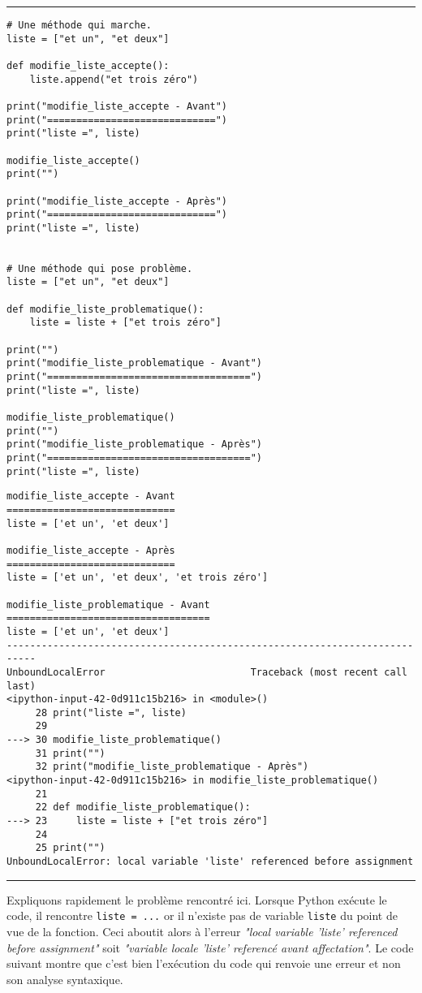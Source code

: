 \bigskip
{\hrule height .5mm}
\begin{verbatim}
# Une méthode qui marche.
liste = ["et un", "et deux"]

def modifie_liste_accepte():
    liste.append("et trois zéro")

print("modifie_liste_accepte - Avant")
print("=============================")
print("liste =", liste)

modifie_liste_accepte()
print("")

print("modifie_liste_accepte - Après")
print("=============================")
print("liste =", liste)


# Une méthode qui pose problème.
liste = ["et un", "et deux"]

def modifie_liste_problematique():
    liste = liste + ["et trois zéro"]

print("")
print("modifie_liste_problematique - Avant")
print("===================================")
print("liste =", liste)

modifie_liste_problematique()
print("")
print("modifie_liste_problematique - Après")
print("===================================")
print("liste =", liste)
\end{verbatim}
 \color{ForestGreen}
\vspace{-1.5em}
\begin{verbatim}
modifie_liste_accepte - Avant
=============================
liste = ['et un', 'et deux']

modifie_liste_accepte - Après
=============================
liste = ['et un', 'et deux', 'et trois zéro']

modifie_liste_problematique - Avant
===================================
liste = ['et un', 'et deux']
---------------------------------------------------------------------------
UnboundLocalError                         Traceback (most recent call last)
<ipython-input-42-0d911c15b216> in <module>()
     28 print("liste =", liste)
     29 
---> 30 modifie_liste_problematique()
     31 print("")
     32 print("modifie_liste_problematique - Après")
<ipython-input-42-0d911c15b216> in modifie_liste_problematique()
     21 
     22 def modifie_liste_problematique():
---> 23     liste = liste + ["et trois zéro"]
     24 
     25 print("")
UnboundLocalError: local variable 'liste' referenced before assignment
\end{verbatim} \color{Black}
{\hrule height .5mm}
\bigskip


Expliquons rapidement le problème rencontré ici. Lorsque Python exécute le code, il rencontre \texttt{liste = ...} or il n'existe pas de variable \texttt{liste} du point de vue de la fonction. Ceci aboutit alors à l'erreur \textit{\textit{"local variable 'liste' referenced before assignment"}} soit \textit{\textit{"variable locale 'liste' referencé avant affectation"}}. Le code suivant montre que c'est bien l'exécution du code qui renvoie une erreur et non son analyse syntaxique.


